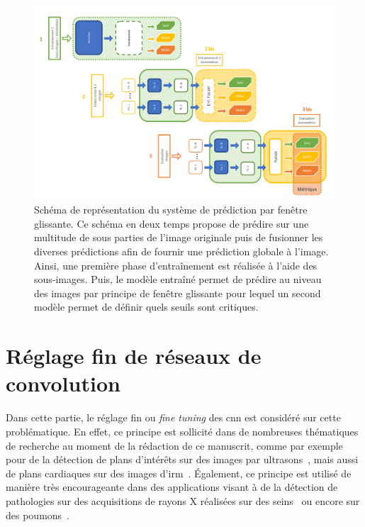\begin{landscape}
\begin{figure}[H]
    \centering
    \includegraphics[width=0.8\linewidth]{contents/chapter_6/resources/scheme_image_improvement_sliding_features.pdf}
    \caption{Schéma de représentation du système de prédiction par fenêtre glissante. Ce schéma en deux temps propose de prédire sur une multitude de sous parties de l'image originale puis de fusionner les diverses prédictions afin de fournir une prédiction globale à l'image. Ainsi, une première phase d'entraînement est réalisée à l'aide des sous-images. Puis, le modèle entraîné permet de prédire au niveau des images par principe de fenêtre glissante pour lequel un second modèle permet de définir quels seuils sont critiques.}
    \label{fig:scheme_image_improvement_sliding_features}
\end{figure}\par
\end{landscape}

\section{Réglage fin de réseaux de convolution}
Dans cette partie, le réglage fin ou \textit{fine tuning} des \gls{cnn} est considéré sur cette problématique. En effet, ce principe est sollicité dans de nombreuses thématiques de recherche au moment de la rédaction de ce manuscrit, comme par exemple pour de la détection de plans d'intérêts sur des images par ultrasons~\cite{Chen2015}, mais aussi de plans cardiaques sur des images d'\gls{irm}~\cite{Margeta2015}. Également, ce principe est utilisé de manière très encourageante dans des applications visant à de la détection de pathologies sur des acquisitions de rayons X réalisées sur des seins~\cite{Lotter2017} ou encore sur des poumons~\cite{Gao2016}.\par

